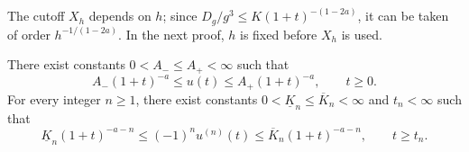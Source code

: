 The cutoff $X_h$ depends on $h$; since $D_g/g^3\le K(1+t)^{-(1-2a)}$, it can be taken of order $h^{-1/(1-2a)}$. In the next proof, $h$ is fixed before $X_h$ is used.

\begin{proposition}
\label{thm:stationary-critical-endpoint}
There exist constants $0<A_-\le A_+<\infty$ such that
\begin{equation}
 A_-(1+t)^{-a}\le u(t)\le A_+(1+t)^{-a},\qquad t\ge0.
 \label{eq:sc-endpoint-bounds}
\end{equation}
For every integer $n\ge1$, there exist constants $0<\underline K_n\le\overline K_n<\infty$ and $t_n<\infty$ such that
\[
 \underline K_n(1+t)^{-a-n}\le(-1)^nu^{(n)}(t)\le\overline K_n(1+t)^{-a-n},\qquad t\ge t_n .
\]
\end{proposition}

